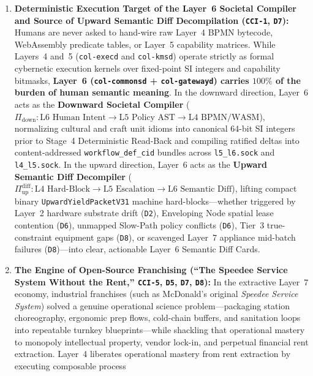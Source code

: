 \begin{enumerate}
\item \textbf{Deterministic Execution Target of the Layer~6 Societal Compiler and Source of Upward Semantic Diff Decompilation (\texttt{CCI-1}, \texttt{D7}):}
        Humans are never asked to hand-wire raw Layer~4 BPMN bytecode, WebAssembly predicate
        tables, or Layer~5 capability matrices. While Layers~4 and~5 (\texttt{col-execd} and
        \texttt{col-kmsd}) operate strictly as formal cybernetic execution kernels over
        fixed-point SI integers and capability bitmasks, \textbf{Layer~6
        (\texttt{col-commonsd} + \texttt{col-gatewayd}) carries $100\%$ of the burden of human
        semantic meaning}. In the downward direction, Layer~6 acts as the \textbf{Downward
        Societal Compiler}
        ($\Pi_{\mathrm{down}} : \text{L6 Human Intent} \to \text{L5 Policy AST} \to \text{L4 BPMN/WASM}$),
        normalizing cultural and craft unit idioms into canonical 64-bit SI integers prior to
        Stage~4 Deterministic Read-Back and compiling ratified deltas into content-addressed
        \texttt{workflow\_def\_cid} bundles across \texttt{l5\_l6.sock} and
        \texttt{l4\_l5.sock}. In the upward direction, Layer~6 acts as the \textbf{Upward
        Semantic Diff Decompiler}
        ($\Pi_{\mathrm{up}}^{\mathrm{diff}} : \text{L4 Hard-Block} \to \text{L5 Escalation} \to \text{L6 Semantic Diff}$),
        lifting compact binary \texttt{UpwardYieldPacketV31} machine hard-blocks---whether
        triggered by Layer~2 hardware substrate drift (\texttt{D2}), Enveloping Node spatial
        lease contention (\texttt{D6}), unmapped Slow-Path policy conflicts (\texttt{D6}),
        Tier~3 true-constraint equipment gaps (\texttt{D8}), or scavenged Layer~7 appliance
        mid-batch failures (\texttt{D8})---into clear, actionable Layer~6 Semantic Diff Cards.
\item \textbf{The Engine of Open-Source Franchising (``The Speedee Service System Without the Rent,'' \texttt{CCI-5}, \texttt{D5}, \texttt{D7}, \texttt{D8}):}
        In the extractive Layer~7 economy, industrial franchises (such as McDonald's original
        \textit{Speedee Service System}) solved a genuine operational science problem---packaging
        station choreography, ergonomic prep flows, cold-chain buffers, and sanitation loops into
        repeatable turnkey blueprints---while shackling that operational mastery to monopoly
        intellectual property, vendor lock-in, and perpetual financial rent extraction. Layer~4
        liberates operational mastery from rent extraction by executing composable process

\end{enumerate}
